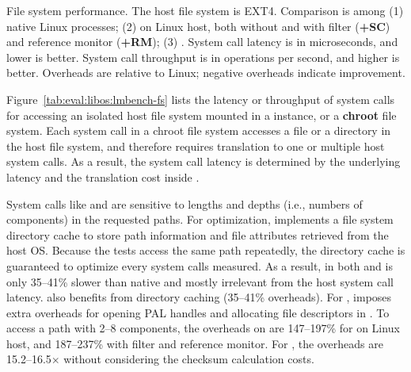 \label{sec:eval:libos:fs}


\begin{table}[t!b!]

\caption{File system performance. The host file system is EXT4. Comparison is among (1) native Linux processes; (2) \graphene{} on Linux host, both without and with \seccomp{} filter ({\bf +SC}) and reference monitor ({\bf +RM}); (3) \graphenesgx{}.
System call latency is in microseconds, and lower is better.
System call throughput is in operations per second, and higher is better. 
Overheads are relative to Linux; negative overheads indicate improvement.} 
\label{tab:eval:libos:lmbench-fs}
\end{table}



Figure~\ref{tab:eval:libos:lmbench-fs}
lists the latency or throughput of system calls
for accessing an isolated host file system mounted in a \thelibos{} instance,
or a {\bf chroot} file system.
Each system call in a chroot file system
accesses a file or a directory in the host file system,
and therefore requires
translation to one or multiple
host system calls.
As a result, the system call latency
is determined by the underlying \hostapi{} latency and the translation cost inside \thelibos{}.



System calls like  and 
are sensitive to lengths and depths (i.e., numbers of components) in the requested paths.
For optimization,
\thelibos{} implements a file system directory cache
to store path information and file attributes retrieved from the host OS.
Because the \lmbench{} tests %
access the same path repeatedly,
the directory cache
is guaranteed to optimize every system calls measured.
As a result,
 in both \graphene{} and \graphenesgx{} is only 35--41\% slower than native
and mostly irrelevant from the host system call latency. 
 also benefits from directory caching
(35--41\% overheads).
For , %
\graphene{} imposes
extra overheads for opening PAL handles and allocating file descriptors in \thelibos{}.
To access a path with 2--8 components,
the overheads on  are 147--197\% for \graphene{} on Linux host, and 187--237\% with \seccomp{} filter and reference monitor.
For \graphenesgx{}, the overheads are 15.2--16.5$\times$
without considering the checksum calculation costs.
